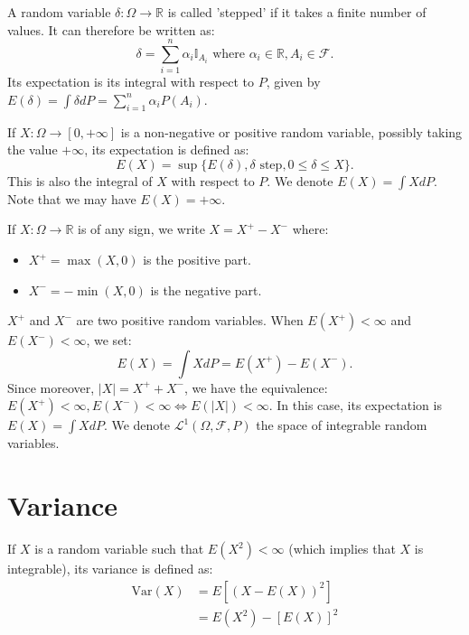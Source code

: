 \begin{definition}
A random variable $\delta : \Omega \to \mathbb{R}$ is called 'stepped' if it takes a finite number of values. It can therefore be written as:
\[ \delta = \sum_{i=1}^n \alpha_i \mathbb{I}_{A_i} \text{ where } \alpha_i \in \mathbb{R}, A_i \in \mathcal{F}. \]
Its expectation is its integral with respect to $P$, given by $E(\delta) = \int \delta dP = \sum_{i=1}^n \alpha_i P(A_i)$.
\end{definition}
\begin{definition}
If $X: \Omega \to [0, +\infty]$ is a non-negative or positive random variable, possibly taking the value $+\infty$, its expectation is defined as:
\[ E(X) = \sup \{E(\delta), \delta \text{ step}, 0 \le \delta \le X\}. \]
This is also the integral of $X$ with respect to $P$. We denote $E(X) = \int X dP$. Note that we may have $E(X) = +\infty$.
\end{definition}%
\begin{definition}
If $X: \Omega \to \mathbb{R}$ is of any sign, we write $X = X^+ - X^-$ where:
\begin{itemize}
    \item $X^+ = \max(X, 0)$ is the positive part.
    \item $X^- = -\min(X, 0)$ is the negative part.
\end{itemize}
$X^+$ and $X^-$ are two positive random variables.
When $E(X^+) < \infty$ and $E(X^-) < \infty$, we set:
\[ E(X) = \int X dP = E(X^+) - E(X^-). \]
Since moreover, $|X| = X^+ + X^-$, we have the equivalence: $E(X^+) < \infty, E(X^-) < \infty \iff E(|X|) < \infty$.
In this case, its expectation is $E(X) = \int X dP$. We denote $\mathcal{L}^1(\Omega, \mathcal{F}, P)$ the space of integrable random variables.
\end{definition}%

\section{Variance}
\begin{definition}[Variance]
If $X$ is a random variable such that $E(X^2) < \infty$ (which implies that $X$ is integrable), its variance is defined as:
\begin{align*}
    \text{Var}(X) &= E[(X-E(X))^2] \\
    &= E(X^2) - [E(X)]^2
\end{align*}
\end{definition}

